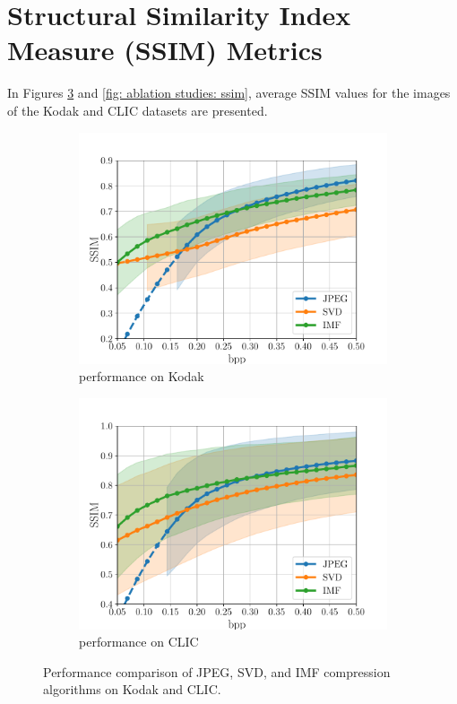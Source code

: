 \section{Structural Similarity Index Measure (SSIM) Metrics}
In Figures \ref{fig:compression_performance_ssim} and \ref{fig: ablation studies: ssim}, average SSIM values for the images of the Kodak and CLIC datasets are presented. 

\begin{figure}[t]
	\centering
	\begin{subfigure}{.45\textwidth}
		\centering
		\includegraphics[width=.95\textwidth]{figures/comparison_kodak_ssim.pdf}
		\caption{performance on Kodak}
		\label{fig: ssim-vs-bpp kodak}
	\end{subfigure}%
	\begin{subfigure}{.45\textwidth}
		\centering
		\includegraphics[width=.95\textwidth]{figures/comparison_clic_ssim.pdf}
		\caption{performance on CLIC}
		\label{fig: ssim-vs-bpp clic}
	\end{subfigure}
	\caption{Performance comparison of JPEG, SVD, and IMF compression algorithms on Kodak and CLIC.}
	\label{fig:compression_performance_ssim}
\end{figure}

